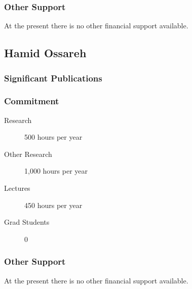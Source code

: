\subsubsection{Other Support}
At the present there is no other financial support available.

\subsection{Hamid Ossareh}
%
\subsubsection{Significant Publications}

\subsubsection{Commitment}
\begin{description}
\item[Research] 500 hours per year
\item[Other Research] 1,000 hours per year
\item[Lectures]  450 hours per year
\item[Grad Students] 0
\end{description}

\subsubsection{Other Support}
At the present there is no other financial support available.


